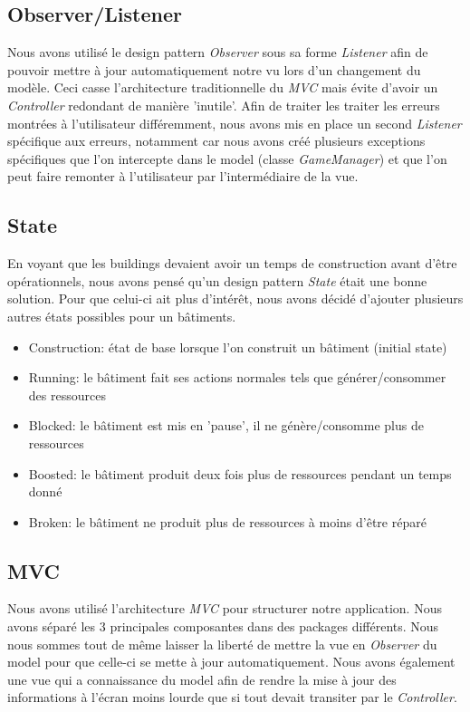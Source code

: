 \documentclass{article}
\begin{document}
\subsection{Observer/Listener}
Nous avons utilisé le design pattern \textit{Observer} sous sa forme \textit{Listener} afin de pouvoir mettre à jour automatiquement
notre vu lors d'un changement du modèle. Ceci casse l'architecture traditionnelle du \textit{MVC} mais évite d'avoir un \textit{Controller}
redondant de manière 'inutile'. Afin de traiter les traiter les erreurs montrées à l'utilisateur différemment, nous avons mis en place
un second \textit{Listener} spécifique aux erreurs, notamment car nous avons créé plusieurs exceptions spécifiques que l'on intercepte
dans le model (classe \textit{GameManager}) et que l'on peut faire remonter à l'utilisateur par l'intermédiaire de la vue.

\subsection{State}
En voyant que les buildings devaient avoir un temps de construction avant d'être opérationnels, nous avons pensé qu'un design pattern
\textit{State} était une bonne solution. Pour que celui-ci ait plus d'intérêt, nous avons décidé d'ajouter plusieurs autres états possibles
pour un bâtiments.
\begin{itemize}
    \item Construction: état de base lorsque l'on construit un bâtiment (initial state)
    \item Running: le bâtiment fait ses actions normales tels que générer/consommer des ressources
    \item Blocked: le bâtiment est mis en 'pause', il ne génère/consomme plus de ressources
    \item Boosted: le bâtiment produit deux fois plus de ressources pendant un temps donné
    \item Broken: le bâtiment ne produit plus de ressources à moins d'être réparé
\end{itemize}

\subsection{MVC}
Nous avons utilisé l'architecture \textit{MVC} pour structurer notre application. Nous avons séparé les 3 principales composantes
dans des packages différents. Nous nous sommes tout de même laisser la liberté de mettre la vue en \textit{Observer} du model pour
que celle-ci se mette à jour automatiquement. Nous avons également une vue qui a connaissance du model afin de rendre la mise à
jour des informations à l'écran moins lourde que si tout devait transiter par le \textit{Controller}.
\end{document}
